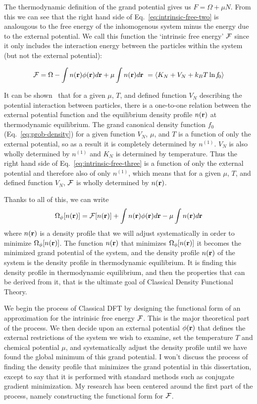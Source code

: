 The thermodynamic definition of the grand potential gives us $F =
\Omega + \mu N$.  From this we can see that the right hand side of
Eq.~\ref{eq:intrinsic-free-two} is analougous to the free energy of
the inhomogenous system minus the energy due to the external
potential.  We call this function the `intrinsic free energy' $\mathcal{F}$
since it only includes the interaction energy between the particles
within the system (but not the external potential):

\begin{align}
  \label{eq:intrinsic-free-three}
  \mathcal{F} = \Omega - \int n(\textbf{r})\phi(\textbf{r})d\textbf{r} + \mu \int n(\textbf{r})d\textbf{r} \
  = \langle K_N + V_N + k_BT \ln \mathit{f}_0 \rangle
\end{align}

It can be shown~\cite{mermin1965thermal,hansen2006theory} that for a
given $\mu$, $T$, and defined function $V_N$ describing the potential
interaction between particles, there is a one-to-one relation between
the external potential function and the equilibrium density profile
$n(\textbf{r})$ at thermodynamic equilibrium.  The grand canonical density
function $f_0$ (Eq.~\ref{eq:prob-density}) for a given function $V_N$,
$\mu$, and $T$ is a function of only the external potential, so as a
result it is completely determined by $n^{(1)}$.  $V_N$ is also wholly
determined by $n^{(1)}$ and $K_N$ is determined by temperature.  Thus
the right hand side of Eq.~\ref{eq:intrinsic-free-three} is a function
of only the external potential and therefore also of only $n^{(1)}$,
which means that for a given $\mu$, $T$, and defined function $V_N$,
$\mathcal{F}$ is wholly determined by $n(\textbf{r})$.

Thanks to all of this, we can write
\begin{align}
  \Omega_{\phi}[n(\textbf{r})] = \mathcal{F}[n(\textbf{r})] + \int n(\textbf{r})\phi(\textbf{r})d\textbf{r} - \mu\int n(\textbf{r})d\textbf{r}
\end{align}
where $n(\textbf{r})$ is a density profile that we will adjust systematically
in order to minimize $\Omega_{\phi}[n(\textbf{r})]$.  The function $n(\textbf{r})$
that minimizes $\Omega_{\phi}[n(\textbf{r})]$ it becomes the
minimized grand potential of the system, and the density profile
$n(\textbf{r})$ of the system is the density profile in thermodynamic
equilibrium.  It is finding this density profile in thermodynamic
equilibrium, and then the properties that can be derived from it, that
is the ultimate goal of Classical Density Functional Theory.

We begin the process of Classical DFT by designing the functional form
of an approximation for the intrinisic free energy $\mathcal{F}$.  This is the
major theoretical part of the process.  We then decide upon an
external potential $\phi(\textbf{r})$ that defines the external restrictions
of the system we wish to examine, set the temperature $T$ and chemical
potential $\mu$, and systematically adjust the density profile until
we have found the global minimum of this grand potential.  I won't
discuss the process of finding the density profile that minimizes the
grand potential in this dissertation, except to say that it is
performed with standard methods such as conjugate gradient
minimization.  My research has been centered around the first part of
the process, namely constructing the functional form for $\mathcal{F}$.



